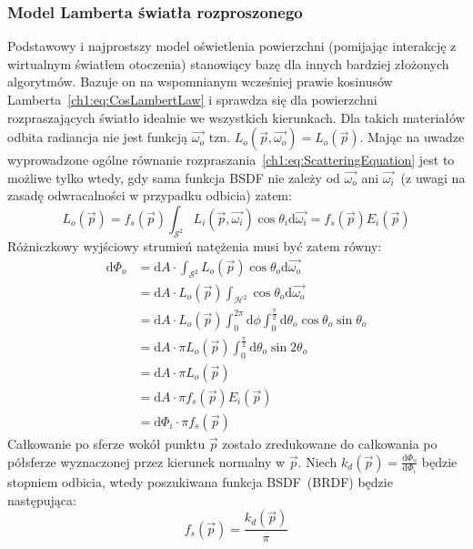 \subsubsection{Model Lamberta światła rozproszonego}
Podstawowy i najprostszy model oświetlenia powierzchni (pomijając interakcję z wirtualnym światłem otoczenia) stanowiący bazę dla innych bardziej złożonych algorytmów. Bazuje on na wspomnianym wcześniej prawie kosinusów Lamberta~\eqref{ch1:eq:CosLambertLaw} i sprawdza się dla powierzchni rozpraszających światło idealnie we wszystkich kierunkach. Dla takich materiałów odbita radiancja nie jest funkcją $\vec{\omega_o}$ tzn. $L_o(\vec{p}, \vec{\omega_o}) = L_o(\vec{p})$. Mając na uwadze wyprowadzone ogólne równanie rozpraszania~\eqref{ch1:eq:ScatteringEquation} jest to możliwe tylko wtedy, gdy sama funkcja BSDF nie zależy od $\vec{\omega_o}$ ani $\vec{\omega_i}$~(z uwagi na zasadę odwracalności w przypadku odbicia) zatem:
\begin{equation}
L_o(\vec{p}) = f_s(\vec{p})\int_{\mathcal{S}^2}L_i(\vec{p}, \vec{\omega_i})\cos\theta_i\mathrm{d}\vec{\omega_i}= f_s(\vec{p})E_i(\vec{p})
\end{equation}
Różniczkowy wyjściowy strumień natężenia musi być zatem równy:
\begin{align}
\mathrm{d}\Phi_o &= \mathrm{d}A\cdot\int_{\mathcal{S}^2}L_o(\vec{p})\cos\theta_o\mathrm{d}\vec{\omega_o}\nonumber\\
&= \mathrm{d}A\cdot L_o(\vec{p})\int_{\mathcal{H}^2}\cos\theta_o\mathrm{d}\vec{\omega_o}\nonumber\\
&= \mathrm{d}A\cdot L_o(\vec{p})\int_0^{2\pi}\mathrm{d}\phi\int_0^{\frac{\pi}{2}}\mathrm{d}\theta_o\cos\theta_o\sin\theta_o\nonumber\\
&= \mathrm{d}A\cdot\pi L_o(\vec{p})\int_0^{\frac{\pi}{2}}\mathrm{d}\theta_o\sin 2\theta_o \nonumber\\
&= \mathrm{d}A\cdot\pi L_o(\vec{p})\nonumber\\
&= \mathrm{d}A\cdot\pi f_s(\vec{p})E_i(\vec{p})\nonumber\\
&= \mathrm{d}\Phi_i\cdot\pi f_s(\vec{p})
\end{align}
Całkowanie po sferze wokół punktu $\vec{p}$ zostało zredukowane do całkowania po półsferze wyznaczonej przez kierunek normalny w $\vec{p}$. Niech $k_d(\vec{p}) = \frac{\mathrm{d}\Phi_o}{\mathrm{d}\Phi_i}$ będzie stopniem odbicia, wtedy poszukiwana funkcja BSDF~(BRDF) będzie następująca:
\begin{equation}
f_s(\vec{p}) = \frac{k_d(\vec{p})}{\pi}
\label{ch1:eq:LambertBRDF}
\end{equation}

